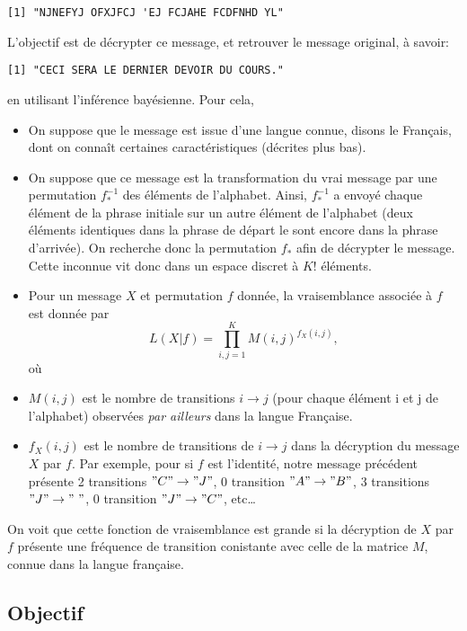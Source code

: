 \documentclass[]{article}
\begin{document}
\begin{verbatim}
[1] "NJNEFYJ OFXJFCJ 'EJ FCJAHE FCDFNHD YL"
\end{verbatim}

L'objectif est de décrypter ce message, et retrouver le message
original, à savoir:

\begin{verbatim}
[1] "CECI SERA LE DERNIER DEVOIR DU COURS."
\end{verbatim}

en utilisant l'inférence bayésienne. Pour cela,

\begin{itemize}
\item
  On suppose que le message est issue d'une langue connue, disons le
  Français, dont on connaît certaines caractéristiques (décrites plus
  bas).
\item
  On suppose que ce message est la transformation du vrai message par
  une permutation \(f_*^{-1}\) des éléments de l'alphabet. Ainsi,
  \(f_*^{-1}\) a envoyé chaque élément de la phrase initiale sur un
  autre élément de l'alphabet (deux éléments identiques dans la phrase
  de départ le sont encore dans la phrase d'arrivée). On recherche donc
  la permutation \(f_*\) afin de décrypter le message. Cette inconnue
  vit donc dans un espace discret à \(K!\) éléments.
\item
  Pour un message \(X\) et permutation \(f\) donnée, la vraisemblance
  associée à \(f\) est donnée par
  \[L(X\vert f) = \prod_{i, j =1}^K M(i, j)^{f_X(i, j)},\] où
\item
  \(M(i, j)\) est le nombre de transitions \(i \rightarrow j\) (pour
  chaque élément i et j de l'alphabet) observées \emph{par ailleurs}
  dans la langue Française.
\item
  \(f_X(i, j)\) est le nombre de transitions de \(i \rightarrow j\) dans
  la décryption du message \(X\) par \(f\). Par exemple, pour si \(f\)
  est l'identité, notre message précédent présente 2 transitions
  \("C" \rightarrow "J"\), 0 transition \("A" \rightarrow "B"\), 3
  transitions \("J" \rightarrow "~"\), 0 transition
  \("J" \rightarrow "C"\), etc\ldots{}
\end{itemize}

On voit que cette fonction de vraisemblance est grande si la décryption
de \(X\) par \(f\) présente une fréquence de transition conistante avec
celle de la matrice \(M\), connue dans la langue française.

\hypertarget{objectif}{%
\subsection{Objectif}\label{objectif}}
\end{document}

